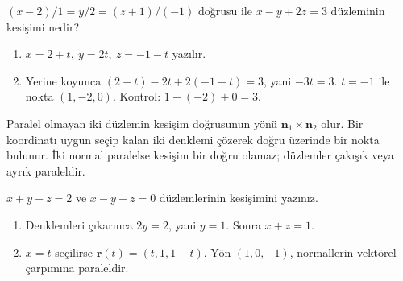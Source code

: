 \begin{tcolorbox}[title={Örnek 2.6 | Dersteki doğru-düzlem kesişimi},colframe=accent]\((x-2)/1=y/2=(z+1)/(-1)\) doğrusu ile \(x-y+2z=3\) düzleminin kesişimi nedir?
\par{}\end{tcolorbox}
\begin{tcolorbox}[title={Adım adım çözüm},colback=green!3!white,colframe=green]\begin{enumerate}
\item \(x=2+t,\ y=2t,\ z=-1-t\) yazılır.
\item Yerine koyunca \((2+t)-2t+2(-1-t)=3\), yani \(-3t=3\). \(t=-1\) ile nokta \((1,-2,0)\). Kontrol: \(1-(-2)+0=3\).
\end{enumerate}\end{tcolorbox}
Paralel olmayan iki düzlemin kesişim doğrusunun yönü \(\mathbf n_1\times\mathbf n_2\) olur. Bir koordinatı uygun seçip kalan iki denklemi çözerek doğru üzerinde bir nokta bulunur. İki normal paralelse kesişim bir doğru olamaz; düzlemler çakışık veya ayrık paraleldir.

\begin{tcolorbox}[title={Örnek 2.7 | İki düzlemin arakesiti},colframe=accent]\(x+y+z=2\) ve \(x-y+z=0\) düzlemlerinin kesişimini yazınız.
\par\vspace{1mm}{\scriptsize\sffamily Pekiştirme}\end{tcolorbox}
\begin{tcolorbox}[title={Adım adım çözüm},colback=green!3!white,colframe=green]\begin{enumerate}
\item Denklemleri çıkarınca \(2y=2\), yani \(y=1\). Sonra \(x+z=1\).
\item \(x=t\) seçilirse \(\mathbf r(t)=(t,1,1-t)\). Yön \((1,0,-1)\), normallerin vektörel çarpımına paraleldir.
\end{enumerate}\end{tcolorbox}
